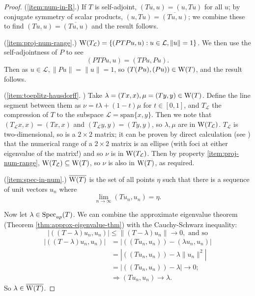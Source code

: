 \documentclass[../main.tex]{subfiles}
\begin{document}
\begin{proof}
(\ref{item:num-in-R}.) If $T$ is self-adjoint, 
$(Tu, u) = (u, Tu)$ for all $u$;
by conjugate symmetry of scalar products, 
$(u, Tu) = \overline{(Tu, u)}$;
we combine these to find 
$(Tu, u) = \overline{(Tu, u)}$
and the result follows. 

(\ref{item:proj-num-range}.) 
$\mathrm{W}(T_\mathcal{L}) = \{( PTPu, u ) : u \in \mathcal{L}, \|u\|=1\}$.
We then use the self-adjointness of $P$ to see
$$( PTPu, u ) = ( TPu, Pu ).$$
Then as $u \in \mathcal{L}, \|Pu\| = \|u\| = 1$,
so $( T(Pu), (Pu) ) \in \mathrm{W}(T)$, and the result follows.

(\ref{item:toeplitz-hausdorff}. 
\cite{gustafson1997numerical})
Take $\lambda = (Tx, x), \mu = (Ty, y) \in \mathrm{W}(T)$. Define the line segment
between them as $\nu = t\lambda + (1-t)\mu$ for $t \in [0, 1]$, and
$T_\mathcal{L}$ the compression of $T$ to the subspace 
$\mathcal{L} = \text{span}\{x, y\}$.
Then we note that $(T_\mathcal{L} x, x) = (Tx, x)$ and $(T_\mathcal{L} y, y) =
(Ty, y)$, so $\lambda, \mu$ are in $\mathrm{W}(T_\mathcal{L})$.
$T_\mathcal{L}$ is two-dimensional, so is a $2 \times 2$ matrix; it can
be proven by direct calculation (see \cite{gustafson1997numerical}) that
the numerical range of a $2 \times 2$ matrix is an ellipse (with foci at
either eigenvalue of the matrix!) and so $\nu$ is in
$\mathrm{W}(T_\mathcal{L})$.
Then by property \ref{item:proj-num-range}, $\mathrm{W}(T_\mathcal{L}) \subseteq
\mathrm{W}(T)$, so $\nu$ is also in $\mathrm{W}(T)$, as required.

(\ref{item:spec-in-num}.) $\overline{\mathrm{W}(T)}$ is the set of all points $\eta$
such that there is a sequence of unit vectors $u_n$ where
$$\lim_{n\rightarrow \infty}( Tu_n, u_n ) = \eta.$$

Now let $\lambda \in \mathrm{Spec}_{ap}(T)$. We can combine the approximate eigenvalue
theorem (Theorem \ref{thm:approx-eigenvalue-thm}) with the
Cauchy-Schwarz inequality: 
$$|( (T - \lambda)u_n, u_n )| \leq \|(T - \lambda)u_n\| \rightarrow 0,\text{ and so}$$
\begin{equation*}
\begin{split}
|( (T - \lambda)u_n, u_n )| &  = |( (Tu_n, u_n) ) - ( \lambda u_n, u_n )| \\
& = |( (Tu_n, u_n) ) - \lambda \|u_n\|^2| \\
& = |( (Tu_n, u_n) ) - \lambda| \rightarrow 0; \\
& \Rightarrow ( Tu_n, u_n ) \rightarrow \lambda.
\end{split}
\end{equation*}
So $\lambda \in \overline{\mathrm{W}(T)}$.
\end{proof}
\end{document}

